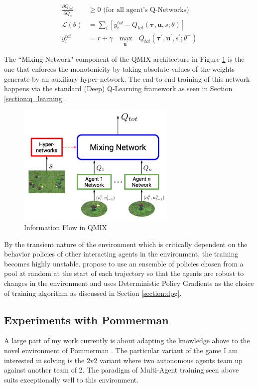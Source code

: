 \documentclass[12pt,a4paper]{article}
\begin{document}
\begin{align}
\frac{\partial Q_{tot}}{\partial Q_a} &\geq 0 \text{ (for all agent's Q-Networks)} \\
\mathcal{L}(\theta) &= \sum_{i} \left[ y_i^{tot} - Q_{tot}(\mathbf{\tau}, \mathbf{u}, s; \theta) \right] \\
y_i^{tot} &= r + \gamma\text{ }\underset{\mathbf{u}^\prime}{\max}\text{ }Q_{tot}(\mathbf{\tau}^\prime, \mathbf{u}^\prime, s^\prime; \theta^{-})
\end{align}

The ``Mixing Network" component of the QMIX architecture in Figure \ref{fig:qmix} is the one
that enforces the monotonicity by taking absolute values of the weights generate by an
auxiliary hyper-network. The end-to-end training of this network happens via the standard
(Deep) Q-Learning framework as seen in Section \ref{section:q_learning}.

\begin{figure}[ht]
\centering
\includegraphics[width=3in]{qmix-arch}
\caption{Information Flow in QMIX \cite{2018arXiv180311485R}} \label{fig:qmix}
\end{figure}

By the transient nature of the environment which is critically dependent on the behavior
policies of other interacting agents in the environment, the training becomes highly unstable.
\cite{2017arXiv170602275L} propose to use an ensemble of policies chosen from a pool at
random at the start of each trajectory so that the agents are robust to changes in the 
environment and uses Deterministic Policy Gradients as the choice of training algorithm
as discussed in Section \ref{section:dpg}.

\subsection{Experiments with Pommerman}

A large part of my work currently is about adapting the knowledge above to the novel 
environment of Pommerman \cite{pommerman}. The particular variant of the game I am
interested in solving is the 2v2 variant where two autonomous agents team up against another
team of 2. The paradigm of Multi-Agent training seen above suits exceptionally well to this
environment.
\end{document}
